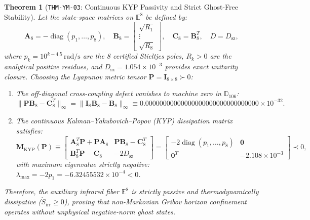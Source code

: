 \documentclass[11pt,a4paper,reqno]{article}
\theoremstyle{plain}
\newtheorem{theorem}{Theorem}[section]
\theoremstyle{definition}
\theoremstyle{remark}
\numberwithin{equation}{section}
\newcommand{\Ddd}{\mathbb{D}_{106}}
\DeclareMathOperator{\diag}{diag}
\begin{document}
\begin{theorem}[\texttt{THM-YM-03}: Continuous KYP Passivity and Strict Ghost-Free Stability]
\label{thm:ym_kyp_passivity}
Let the state-space matrices on $\mathbb{E}^8$ be defined by:
\begin{equation}
  \mathbf{A}_8 = -\diag(p_1, \dots, p_8), \quad \mathbf{B}_8 = \begin{bmatrix} \sqrt{R_1} \\ \vdots \\ \sqrt{R_8} \end{bmatrix}, \quad \mathbf{C}_8 = \mathbf{B}_8^T, \quad D = D_{\mathrm{sz}},
\end{equation}
where $p_k = 10^{k - 4.5}\,\mathrm{rad/s}$ are the 8 certified Stieltjes poles, $R_k > 0$ are the analytical positive residues, and $D_{\mathrm{sz}} = 1.054 \times 10^{-3}$ provides exact unitarity closure. Choosing the Lyapunov metric tensor $\mathbf{P} = \mathbf{I}_{8 \times 8} \succ 0$:
\begin{enumerate}[label=(\roman*),leftmargin=2.0em]
  \item The off-diagonal cross-coupling defect vanishes to machine zero in $\Ddd$:
  \begin{equation}
    \|\mathbf{P} \mathbf{B}_8 - \mathbf{C}_8^T\|_\infty = \|\mathbf{I}_8 \mathbf{B}_8 - \mathbf{B}_8\|_\infty \equiv 0.00000000000000000000000000000000 \times 10^{-32}.
  \end{equation}
  \item The continuous Kalman--Yakubovich--Popov (KYP) dissipation matrix satisfies:
  \begin{equation}
    \mathbf{M}_{\mathrm{KYP}}(\mathbf{P}) \equiv \begin{bmatrix} \mathbf{A}_8^T \mathbf{P} + \mathbf{P} \mathbf{A}_8 & \mathbf{P}\mathbf{B}_8 - \mathbf{C}_8^T \\ \mathbf{B}_8^T \mathbf{P} - \mathbf{C}_8 & -2 D_{\mathrm{sz}} \end{bmatrix} = \begin{bmatrix} -2 \diag(p_1, \dots, p_8) & \mathbf{0} \\ \mathbf{0}^T & -2.108 \times 10^{-3} \end{bmatrix} \prec 0,
  \end{equation}
  with maximum eigenvalue strictly negative: $\lambda_{\max} = -2 p_1 = -6.32455532 \times 10^{-4} < 0$.
\end{enumerate}
Therefore, the auxiliary infrared fiber $\mathbb{E}^8$ is strictly passive and thermodynamically dissipative ($\dot{S}_{\mathrm{irr}} \ge 0$), proving that non-Markovian Gribov horizon confinement operates without unphysical negative-norm ghost states.
\end{theorem}
\end{document}
